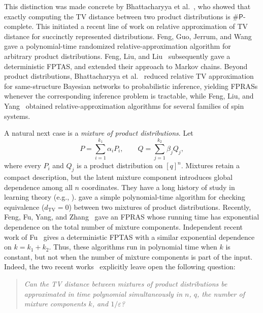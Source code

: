 \documentclass{article}
\begin{document}
This distinction was made concrete by Bhattacharyya et
al.~\cite{ijcai2023p387,bhattacharyya2025total}, who showed that exactly computing the TV distance
between two product distributions is $\#\mathsf{P}$-complete. This
initiated a recent line of work on relative approximation of TV distance
for succinctly represented distributions. Feng, Guo, Jerrum, and
Wang~\cite{feng2023simple} gave a polynomial-time randomized relative-approximation
algorithm for arbitrary product distributions. Feng, Liu, and
Liu~\cite{feng2024soda} subsequently gave a deterministic FPTAS, and extended
their approach to Markov chains. Beyond product distributions,
Bhattacharyya et al.~\cite{bhattacharyya2024inference} reduced relative TV approximation for
same-structure Bayesian networks to probabilistic inference, yielding
FPRASs whenever the corresponding inference problem is tractable, while
Feng, Liu, and Yang~\cite{pmlr-v291-feng25a} obtained relative-approximation
algorithms for several families of spin systems.

A natural next case is a \emph{mixture of product distributions}. Let
\[
    P=\sum_{i=1}^{k_1}\alpha_i P_i,
    \qquad
    Q=\sum_{j=1}^{k_2}\beta_j Q_j,
\]
where every $P_i$ and $Q_j$ is a product distribution on $[q]^n$.
Mixtures retain a compact description, but the latent mixture component
introduces global dependence among all $n$ coordinates. 
They have a long history of study in learning theory (e.g., \cite{feldman2008learning,jain2014learning,gordon2021source,gordon2024identification}).
\cite{bhattacharyya2025computational} 
gave a simple polynomial-time algorithm for checking equivalence ($d_{\mathrm{TV}}=0$) 
between two mixtures of product distributions.
Recently, Feng,
Fu, Yang, and Zhang~\cite{feng2026computing} gave an FPRAS whose running time has
exponential dependence on the total number of mixture components.
Independent recent work of Fu~\cite{Fu26} gives a deterministic
FPTAS with a similar exponential dependence on
$k=k_1+k_2$. Thus, these algorithms run in polynomial time when $k$ is
constant, but not when the number of mixture components is part of the
input. Indeed, the two recent works~\cite{feng2026computing, Fu26} explicitly leave open the
following question:
\begin{quote}
\centering
\emph{Can the TV distance between mixtures of product distributions be
approximated in time polynomial simultaneously in $n$, $q$, the number of
mixture components $k$, and $1/\varepsilon$?}
\end{quote}
\end{document}
